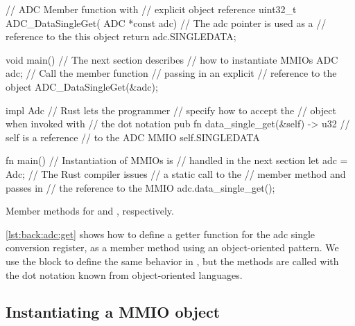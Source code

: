 \begin{listing}[H]
  \centering
  \begin{minipage}{0.47\textwidth}
  \begin{listing}[H]
      \begin{ccode}
// ADC Member function with
// explicit object reference
uint32_t ADC_DataSingleGet(
           ADC *const adc) {
  // The adc pointer is used as a
  // reference to the this object
  return adc.SINGLEDATA;
}

void main() {
  // The next section describes
  // how to instantiate MMIOs
  ADC adc;
  // Call the member function
  // passing in an explicit
  // reference to the object
  ADC_DataSingleGet(&adc);
}
      \end{ccode}
  \end{listing}
  \end{minipage}
  \hfill
  \begin{minipage}{0.47\textwidth}
  \begin{listing}[H]
      \begin{rustcode}
impl Adc {
  // Rust lets the programmer
  // specify how to accept the
  // object when invoked with
  // the dot notation
  pub fn data_single_get(&self)
  -> u32 { // self is a reference
    // to the ADC MMIO
    self.SINGLEDATA
  }
}

fn main() {
  // Instantiation of MMIOs is
  // handled in the next section
  let adc = Adc;
  // The Rust compiler issues
  // a static call to the
  // member method and passes in
  // the reference to the MMIO
  adc.data_single_get();
}
      \end{rustcode}
  \end{listing}
  \end{minipage}
  \caption{Member methods for {\C} and {\rust}, respectively.}
  \label{lst:back:adc:get}

\end{listing}

\autoref{lst:back:adc:get} shows how to define a getter function for the \gls{adc} single conversion register, as a member method using an object-oriented pattern.
We use the  block to define the same behavior in {\rust}, but the methods are called with the dot notation known from object-oriented languages.

\subsection{Instantiating a MMIO object}

